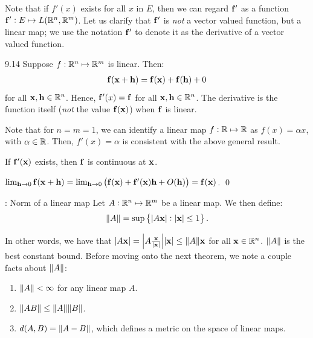 \noindent Note that if $f'(x)$ exists for all $x$ in $E$, then we can regard $\mathbf{f}'$ as a function $\mathbf{f}': E \mapsto L(\mathbb{R}^n, \mathbb{R}^m)$. Let us clarify that $\mathbf{f}'$ is \emph{not} a vector valued function, but a linear map; we use the notation $\mathbf{f}'$ to denote it as the derivative of a vector valued function.

\setcounter{rudin}{13}
\begin{example}{}{9.14}
    Suppose $f: \mathbb{R}^n \mapsto \mathbb{R}^m$ is linear. Then:
    \begin{align*}
        \mathbf{f}(\mathbf{x} + \mathbf{h}) = \mathbf{f}(\mathbf{x}) + \mathbf{f}(\mathbf{h}) + 0
    \end{align*}
    for all $\mathbf{x}, \mathbf{h} \in \mathbb{R}^n$. Hence, $\mathbf{f}'(x) = \mathbf{f}$ for all $\mathbf{x}, \mathbf{h} \in \mathbb{R}^n$. The derivative is the function itself (\emph{not} the value $\mathbf{f}(\mathbf{x})$) when $\mathbf{f}$ is linear.

    Note that for $n = m = 1$, we can identify a linear map $f: \mathbb{R} \mapsto \mathbb{R}$ as $f(x) = \alpha x$, with $\alpha \in \mathbb{R}$. Then, $f'(x) = \alpha$ is consistent with the above general result.
\end{example}
\begin{ntheorem}{}{}
    If $\mathbf{f}'(\mathbf{x})$ exists, then $\mathbf{f}$ is continuous at $\mathbf{x}$.
\end{ntheorem}
\begin{nproof}
    $\lim_{\mathbf{h} \rightarrow 0}\mathbf{f}(\mathbf{x} + \mathbf{h}) = \lim_{\mathbf{h} \rightarrow 0}\left(\mathbf{f}(\mathbf{x}) + \mathbf{f}'(\mathbf{x})\mathbf{h} + O(\mathbf{h})\right) = \mathbf{f}(\mathbf{x})$. \qed
\end{nproof}

\begin{ndef}{: Norm of a linear map}{}
    Let $A: \mathbb{R}^n \mapsto \mathbb{R}^m$ be a linear map. We then define:
    \begin{align*}
        \norm{A} = \sup\set{\abs{A\ensuremath{\mathbf{x}}}: \abs{\ensuremath{\mathbf{x}}} \leq 1}.
    \end{align*}
\end{ndef}
\noindent In other words, we have that $\abs{A\mathbf{x}} = \abs{A\frac{\mathbf{x}}{\abs{\mathbf{x}}}}\abs{\mathbf{x}} \leq \norm{A}\mathbf{x}$ for all $\mathbf{x} \in \mathbb{R}^n$. $\norm{A}$ is the best constant bound. Before moving onto the next theorem, we note a couple facts about $\norm{A}$:
\begin{enumerate}
    \item $\norm{A} < \infty$ for any linear map $A$.
    \item $\norm{AB} \leq \norm{A}\norm{B}$.
    \item $d(A, B) = \norm{A - B}$, which defines a metric on the space of linear maps.
\end{enumerate}

